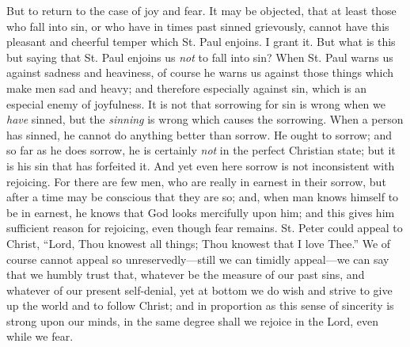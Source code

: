 But to return to the case of joy and fear. It may be objected, that
at least those who fall into sin, or who have in times past sinned
grievously, cannot have this pleasant and cheerful temper which St.
Paul enjoins. I grant it. But what is this but saying that St. Paul
enjoins us \emph{not} to fall into sin? When St. Paul warns us against
sadness and heaviness, of course he warns us against those things
which make men sad and heavy; and therefore especially against sin,
which is an especial enemy of joyfulness. It is not that sorrowing for
sin is wrong when we \emph{have} sinned, but the \emph{sinning} is wrong which
causes the sorrowing. When a person has sinned, he cannot do anything
better than sorrow. He ought to sorrow; and so far as he does sorrow,
he is certainly \emph{not} in the perfect Christian state; but it is his sin
that has forfeited it. And yet even here sorrow is not inconsistent
with rejoicing. For there are few men, who are really in earnest in
their sorrow, but after a time may be conscious that they are so; and,
when man knows himself to be in earnest, he knows that God looks
mercifully upon him; and this gives him sufficient reason for
rejoicing, even though fear remains. St. Peter could appeal to Christ,
``Lord, Thou knowest all things; Thou knowest that I love
Thee.'' We of course cannot appeal so unreservedly—still we can
timidly appeal—we can say that we humbly trust that, whatever be the
measure of our past sins, and whatever of our present self-denial, yet
at bottom we do wish and strive to give up the world and to follow
Christ; and in proportion as this sense of sincerity is strong upon
our minds, in the same degree shall we rejoice in the Lord, even while
we fear.

